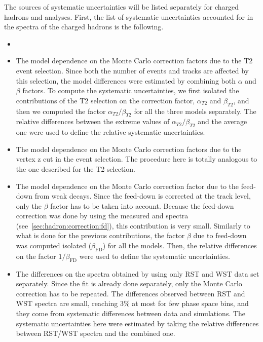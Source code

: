 The sources of systematic uncertainties will be listed
separately for charged hadrons and \vzero analyses.
First, the list of systematic uncertainties accounted for in
the spectra of the charged hadrons is the following.
\begin{itemize}

\item {}

\item The model dependence on the Monte Carlo correction factors due to
  the T2 event selection. Since both the number of events and tracks
  are affected by this selection, the model differences were estimated by
  combining both $\alpha$ and $\beta$ factors. To compute the systematic
  uncertainties, we first isolated the contributions of the T2 selection on the
  correction factor, $\alpha_{T2}$ and $\beta_{T2}$, and then we computed
  the factor $\alpha_{T2}/\beta_{T2}$ for all the three models separately.
  The relative differences between the extreme values of $\alpha_{T2}/\beta_{T2}$
  and the average one were used to define the relative systematic uncertainties.

\item The model dependence on the Monte Carlo correction factors due to
  the vertex z cut in the event selection.
  The procedure here is totally analogous to the one described for the T2 selection.
  
\item The model dependence on the Monte Carlo correction factor due to
  the feed-down from weak decays. Since the feed-down is corrected
  at the track level, only the $\beta$ factor has to be taken into account.
  Because the feed-down correction was done by using the measured
  \lambs and \kzeros spectra (see~\cref{sec:hadron:correction:fd}),
  this contribution is very small. Similarly to what is done for the previous
  contributions, the factor $\beta$ due to feed-down was computed isolated ($\beta_\text{FD}$)
  for all the models. Then, the relative differences on the factor
  $1/\beta_\text{FD}$ were used to define the systematic uncertainties.

\item The differences on the spectra obtained by using only
  RST and WST data set separately. Since the \dedx fit
  is already done separately, only the Monte Carlo correction has to be
  repeated. The differences observed between RST and WST spectra are small,
  reaching 3\% at most for few phase space bins, and they come from
  systematic differences between data and simulations. The systematic
  uncertainties here were estimated by taking the relative differences
  between RST/WST spectra and the combined one.
  
\end{itemize}

